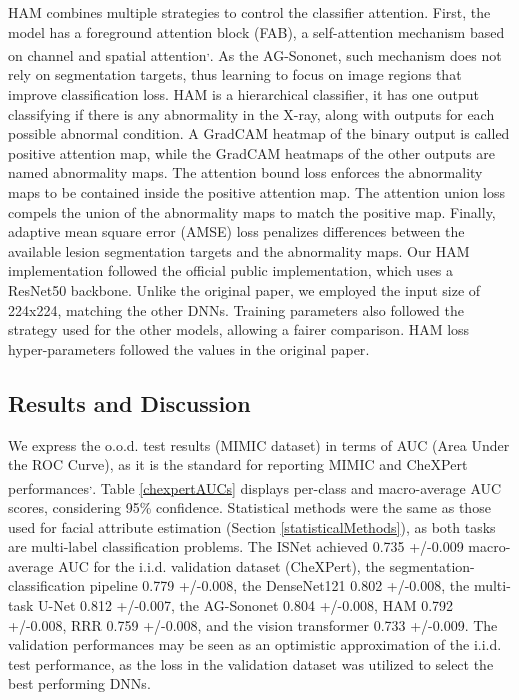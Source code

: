 \documentclass[fleqn,10pt]{wlscirep}
\begin{document}
{HAM combines multiple strategies to control the classifier attention. First, the model has a foreground attention block (FAB), a self-attention mechanism based on channel and spatial attention\cite{HAM}\textsuperscript{,}\cite{attentionSurvey}. As the AG-Sononet, such mechanism does not rely on segmentation targets, thus learning to focus on image regions that improve classification loss. HAM is a hierarchical classifier, it has one output classifying if there is any abnormality in the X-ray, along with outputs for each possible abnormal condition. A GradCAM heatmap of the binary output is called positive attention map, while the GradCAM heatmaps of the other outputs are named abnormality maps. The attention bound loss\cite{HAM} enforces the abnormality maps to be contained inside the positive attention map. The attention union loss\cite{HAM} compels the union of the abnormality maps to match the positive map. Finally, adaptive mean square error (AMSE) loss\cite{HAM} penalizes differences between the available lesion segmentation targets and the abnormality maps. Our HAM implementation followed the official public implementation\cite{HAM}, which uses a ResNet50\cite{ResNet} backbone. Unlike the original paper, we employed the input size of 224x224, matching the other DNNs. Training parameters also followed the strategy used for the other models, allowing a fairer comparison. HAM loss hyper-parameters followed the values in the original paper\cite{HAM}.

\subsection {Results and Discussion}

We express the o.o.d. test results (MIMIC dataset) in terms of AUC (Area Under the ROC Curve), as it is the standard for reporting MIMIC and CheXPert performances\cite{irvin2019chexpert}\textsuperscript{,}\cite{HAM}. Table \ref{chexpertAUCs} displays per-class and macro-average AUC scores, considering 95\% confidence. Statistical methods were the same as those used for facial attribute estimation (Section \ref{statisticalMethods}), as both tasks are multi-label classification problems. The ISNet achieved 0.735 +/-0.009 macro-average AUC for the i.i.d. validation dataset (CheXPert), the segmentation-classification pipeline 0.779 +/-0.008, the DenseNet121 0.802 +/-0.008, the multi-task U-Net 0.812 +/-0.007, the AG-Sononet 0.804 +/-0.008, HAM 0.792 +/-0.008, RRR 0.759 +/-0.008, and the vision transformer 0.733 +/-0.009. The validation performances may be seen as an optimistic approximation of the i.i.d. test performance, as the loss in the validation dataset was utilized to select the best performing DNNs.

}
\end{document}
